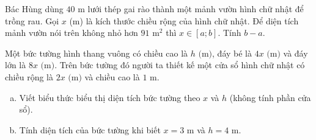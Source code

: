 \begin{bt}%
	Bác Hùng dùng $40$ m lưới thép gai rào thành một mảnh vườn hình chữ nhật để trồng rau. Gọi $x$  (m) là kích thước chiều rộng của hình chữ nhật. Để diện tích mảnh vườn nói trên không nhỏ hơn $91$ m$^2$ thì $x\in [a;b]$. Tính $b-a$.
\end{bt}

\begin{bt}%
Một bức tường hình thang vuông có chiều cao là $h\text{ (m)}$, đáy bé là $4x\text{ (m)}$ và đáy lớn là $8x\text{ (m)}$. Trên bức tường đó người ta thiết kế một cửa sổ hình chữ nhật có chiều rộng là $2x\text{ (m)}$ và chiều cao là $1\text{ m}$.
\begin{enumerate}[a)]
	\item Viết biểu thức biểu thị diện tích bức tường theo $x$ và $h$ (không tính phần cửa sổ).
	\item Tính diện tích của bức tường khi biết $x = 3\text{ m}$ và $h = 4\text{ m}$.
\end{enumerate}
\end{bt}

